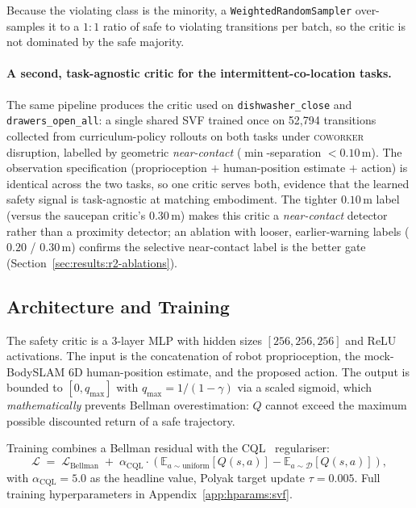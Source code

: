 \documentclass[11pt,a4paper]{report}
\newcommand{\coworker}{\textsc{coworker}}
\newcommand{\bodyslampp}{BodySLAM\nolinebreak[4]\hspace{-.05em}\raisebox{.2ex}{\scriptsize ++}}
\begin{document}
Because the violating class is the minority, a
\texttt{WeightedRandomSampler} over-samples it to a $1{:}1$ ratio of
safe to violating transitions per batch, so the critic is not
dominated by the safe majority.

\paragraph{A second, task-agnostic critic for the intermittent-co-location tasks.}
The same pipeline produces the critic used on
\texttt{dishwasher\_close} and \texttt{drawers\_open\_all}: a single
shared SVF trained once on 52{,}794 transitions collected from
curriculum-policy rollouts on both tasks under \coworker{}
disruption, labelled by geometric \emph{near-contact}
($\min$-separation $< 0.10$\,m). The observation specification
(proprioception $+$ human-position estimate $+$ action) is identical
across the two tasks, so one critic serves both, evidence that the
learned safety signal is task-agnostic at matching embodiment. The
tighter $0.10$\,m label (versus the saucepan critic's $0.30$\,m) makes
this critic a \emph{near-contact} detector rather than a proximity
detector; an ablation with looser, earlier-warning labels ($0.20$ /
$0.30$\,m) confirms the selective near-contact label is the better
gate (Section~\ref{sec:results:r2-ablations}).

\subsection{Architecture and Training}
\label{sec:method:filter:arch}

The safety critic is a 3-layer MLP with hidden sizes
$[256, 256, 256]$ and ReLU activations. The input is the
concatenation of robot proprioception, the mock-\bodyslampp{} 6D
human-position estimate, and the proposed action. The output is
bounded to $[0, q_{\max}]$ with $q_{\max} = 1/(1-\gamma)$ via a
scaled sigmoid, which \emph{mathematically} prevents Bellman
overestimation: $Q$ cannot exceed the maximum possible discounted
return of a safe trajectory.

Training combines a Bellman residual with the
\textsc{CQL}~\cite{kumar2020cql} regulariser:
\begin{equation}
  \mathcal{L} \;=\; \mathcal{L}_{\mathrm{Bellman}}
  \;+\; \alpha_{\mathrm{CQL}} \cdot
  \left(\mathbb{E}_{a \sim \mathrm{uniform}}\!\left[Q(s,a)\right]
       - \mathbb{E}_{a \sim \mathcal{D}}\!\left[Q(s,a)\right]\right),
  \label{eq:cql-loss}
\end{equation}
with $\alpha_{\mathrm{CQL}} = 5.0$ as the headline value, Polyak
target update $\tau = 0.005$. Full training hyperparameters in
Appendix~\ref{app:hparams:svf}.
\end{document}
